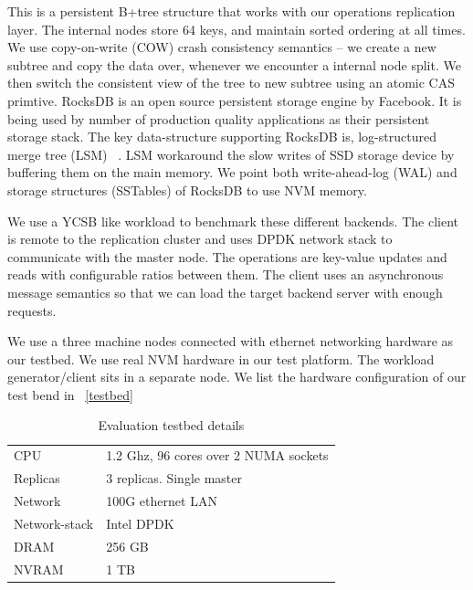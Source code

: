 This is a persistent B+tree structure that works with our operations replication layer. The internal nodes
store 64 keys, and maintain sorted ordering at all times. We use copy-on-write (COW) crash consistency 
semantics -- we create a new subtree and copy the data over, whenever we encounter a internal node split. 
We then switch the consistent view of the tree to new subtree using an atomic CAS primtive. 
RocksDB is an open source persistent storage engine by Facebook. It is being used by number of production quality
applications as their persistent storage stack. The key data-structure supporting RocksDB is, log-structured merge
tree (LSM) ~\cite{lsm}. LSM workaround the slow writes of SSD storage device by buffering them on the main memory.
We point both write-ahead-log (WAL) and storage structures (SSTables) of RocksDB to use NVM memory.

We use a YCSB like workload to benchmark these different backends. The client is remote to the replication
cluster and uses DPDK network stack to communicate with the master node. The operations are key-value updates and
reads with configurable ratios between them. The client uses an asynchronous message semantics so that we can
load the target backend server with enough requests.

We use a three machine nodes connected with ethernet networking hardware as our testbed. We use real NVM hardware
in our test platform. The workload generator/client sits in a separate node. We list the hardware configuration of
our test bend in ~\autoref{testbed}
\begin{table}[h!]
	\centering
	\begin{tabular}{l|l}
		\hline
		CPU & 1.2 Ghz, 96 cores over 2 NUMA sockets \\
		Replicas & 3 replicas. Single master \\
		Network & 100G ethernet LAN \\
		Network-stack & Intel DPDK \\
		DRAM & 256 GB \\
		NVRAM & 1 TB \\
	\end{tabular}
	\caption{Evaluation testbed details}
	\label{testbed}
\end{table}


